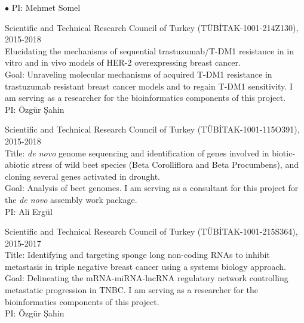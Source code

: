\documentclass[margin,line]{res}
\newenvironment{list2}{
  \begin{list}{$\bullet$}{%
      \setlength{\itemsep}{0in}
      \setlength{\parsep}{0in} \setlength{\parskip}{0in}
      \setlength{\topsep}{0in} \setlength{\partopsep}{0in} 
      \setlength{\leftmargin}{0.2in}}}{\end{list}}
\begin{document}
\begin{resume}
\begin{list2}
                                         PI: Mehmet Somel
                                       \item
                                         Scientific and Technical Research Council of Turkey (T\"{U}B\.{I}TAK-1001-214Z130), 2015-2018\\
                                         Elucidating the mechanisms of sequential trastuzumab/T-DM1 resistance in in vitro and in vivo models of HER-2
                                         overexpressing breast cancer.\\
                                         Goal: Unraveling molecular mechanisms of acquired T-DM1 resistance in trastuzumab resistant breast 
                                         cancer models and to regain T-DM1 sensitivity. I am serving as a researcher 
                                         for the bioinformatics components of this project.\\
                                         PI: Özgür Şahin
                                       \item
                                         Scientific and Technical Research Council of Turkey (T\"{U}B\.{I}TAK-1001-115O391), 2015-2018\\
                                         Title: {\it de novo} genome sequencing and identification of genes involved in biotic-abiotic stress of wild beet species 
                                         (Beta Corolliflora and Beta Procumbens), and cloning several genes activated in drought.\\
                                         Goal: Analysis of beet genomes. I am serving as a consultant for this project for the {\it de novo} assembly work package.\\
                                         PI: Ali Ergül
                                       \item
                                         Scientific and Technical Research Council of Turkey (T\"{U}B\.{I}TAK-1001-215S364), 2015-2017\\
                                         Title: Identifying and targeting sponge long non-coding RNAs to inhibit metastasis in triple negative breast cancer
                                         using a systems biology approach.\\
                                         Goal: Delineating the mRNA-miRNA-lncRNA regulatory network controlling metastatic progression in TNBC. I am serving as a researcher 
                                         for the bioinformatics components of this project.\\
                                         PI: Özgür Şahin


\end{list2}
\end{resume}
\end{document}
